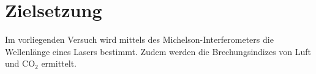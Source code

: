 \section{Zielsetzung}
\label{sec:Zielsetzung}
Im vorliegenden Versuch wird mittels des Michelson-Interferometers die Wellenlänge eines Lasers bestimmt. Zudem werden die Brechungsindizes von Luft und $\mathrm{CO_2}$ ermittelt.
